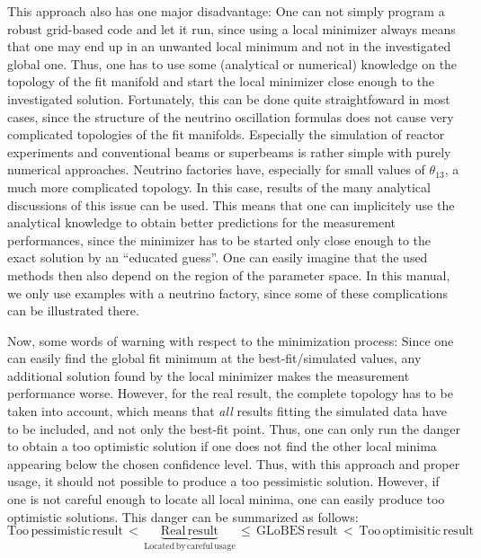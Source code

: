 This approach also has one major disadvantage: One can not simply program a robust grid-based code and let it run, since using a local minimizer always means that one may end up in an unwanted local minimum and not in the investigated global one. Thus, one has to use some (analytical or numerical) knowledge on the topology of the fit manifold and start the local minimizer close enough to the investigated solution. Fortunately, this can be done quite straightfoward in most cases, since the structure of the neutrino oscillation formulas does not cause very complicated topologies of the fit manifolds. Especially the simulation of reactor experiments and conventional beams or superbeams is rather simple with purely numerical
approaches. Neutrino factories have, especially for small values of
$\theta_{13}$, a much more complicated topology. In this case, results
of the many analytical discussions of this issue can be used. This means
 that one can implicitely use the analytical knowledge to obtain better predictions for the measurement performances, since the minimizer has
 to be started only close enough to the exact solution by an ``educated
 guess''. One can easily imagine that the used methods then also depend
 on the region of the parameter space. In this manual, we only use
 examples with a neutrino factory, since some of these complications
 can be illustrated there.

Now, some words of warning with respect to the minimization process: 
Since one can easily find the global fit minimum at the best-fit/simulated values, any additional solution found by the local minimizer makes the measurement performance worse. However, for the real result, the complete
topology has to be taken into account, which means that {\em all} results
fitting the simulated data have to be included, and not only the best-fit
point. Thus, one can only run the danger to obtain a too optimistic solution if one does not find the other local minima appearing below the chosen confidence level. Thus, with this approach and proper usage, it should not possible to produce a too pessimistic solution. 
However, if one is not careful enough to locate
all local minima, one can easily produce too optimistic solutions.
This danger can be summarized as follows:
\begin{equation}
\mathrm{Too \, pessimistic \, result} \, < \, \underbrace{\mathrm{Real \, result}}_{\mathrm{Located \, by \, careful \, usage}} \, \le \, \mathrm{GLoBES \, result} \,  < \,  \mathrm{Too \, optimisitic \, result} \nonumber
\end{equation}

